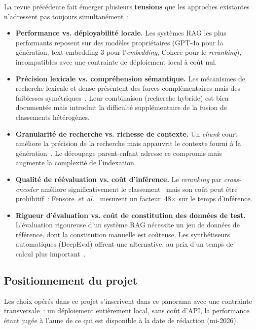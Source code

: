\documentclass[11pt,a4paper]{article}
\begin{document}
La revue précédente fait émerger plusieurs \textbf{tensions} que les approches existantes n'adressent pas toujours simultanément~:

\begin{itemize}
  \item \textbf{Performance vs. déployabilité locale.} Les systèmes RAG les plus performants reposent sur des modèles propriétaires (GPT-4o pour la génération, text-embedding-3 pour l'\textit{embedding}, Cohere pour le \textit{reranking}), incompatibles avec une contrainte de déploiement local à coût nul.

  \item \textbf{Précision lexicale vs. compréhension sémantique.} Les mécanismes de recherche lexicale et dense présentent des forces complémentaires mais des faiblesses symétriques~\cite{strich2026bm25}. Leur combinaison (recherche hybride) est bien documentée mais introduit la difficulté supplémentaire de la fusion de classements hétérogènes.

  \item \textbf{Granularité de recherche vs. richesse de contexte.} Un \textit{chunk} court améliore la précision de la recherche mais appauvrit le contexte fourni à la génération~\cite{lu2025hichunk}. Le découpage parent-enfant adresse ce compromis mais augmente la complexité de l'indexation.

  \item \textbf{Qualité de réévaluation vs. coût d'inférence.} Le \textit{reranking} par \textit{cross-encoder} améliore significativement le classement~\cite{nogueira2019bert} mais son coût peut être prohibitif~: Fensore~\textit{et~al.}~\cite{fensore2025liverag} mesurent un facteur~48$\times$ sur le temps d'inférence.

  \item \textbf{Rigueur d'évaluation vs. coût de constitution des données de test.} L'évaluation rigoureuse d'un système RAG nécessite un jeu de données de référence, dont la constitution manuelle est coûteuse. Les synthétiseurs automatiques (DeepEval) offrent une alternative, au prix d'un temps de calcul plus important~\cite{deepeval2024}.
\end{itemize}

\subsection*{Positionnement du projet}

Les choix opérés dans ce projet s'inscrivent dans ce panorama avec une contrainte transversale~: un déploiement entièrement local, sans coût d'API, la performance étant jugée à l'aune de ce qui est disponible à la date de rédaction (mi-2026).
\end{document}
